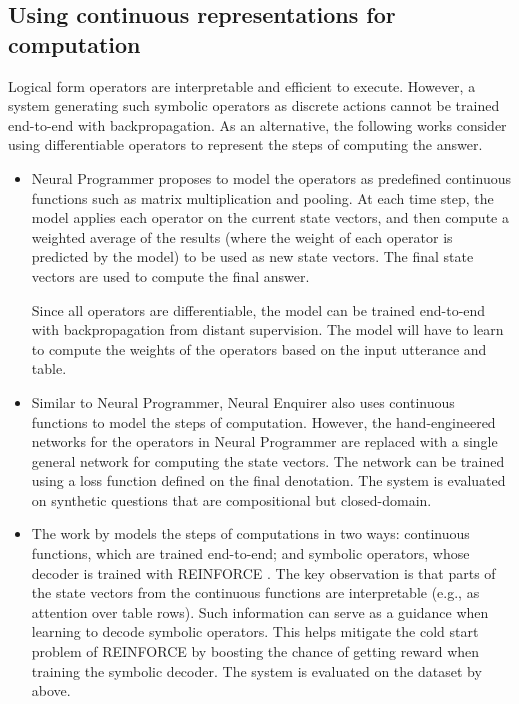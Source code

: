 \subsection{Using continuous representations for computation}

Logical form operators are interpretable
and efficient to execute.
However,
a system generating such symbolic operators as discrete actions
cannot be trained end-to-end with backpropagation.
As an alternative,
the following works consider using 
differentiable operators
to represent the steps of computing the answer.

\begin{itemize}
\item 
Neural Programmer \cite{neelakantan2016neural,neelakantan2017learning}
proposes to model the operators as predefined continuous functions
such as matrix multiplication and pooling.
At each time step, the model
applies each operator on the current state vectors,
and then compute a weighted average of the results
(where the weight of each operator is predicted by the model)
to be used as new state vectors.
The final state vectors are used to compute the final answer.

Since all operators are differentiable,
the model can be trained end-to-end with backpropagation
from distant supervision.
The model will have to learn to compute the weights of the operators
based on the input utterance and table.

\item
Similar to Neural Programmer,
Neural Enquirer \cite{yin2016neural}
also uses continuous functions to model the steps of computation.
However,
the hand-engineered networks for the operators in Neural Programmer
are replaced with a single general network
for computing the state vectors.
The network can be trained using a loss function
defined on the final denotation.
The system is evaluated on synthetic questions that are compositional
but closed-domain.

\item
The work by \citet{mou2017coupling}
models the steps of computations in two ways:
continuous functions,
which are trained end-to-end;
and symbolic operators,
whose decoder is trained with REINFORCE \cite{williams1992simple}.
The key observation is that parts of the state vectors
from the continuous functions are interpretable
(e.g., as attention over table rows).
Such information
can serve as a guidance when learning to decode symbolic operators.
This helps mitigate the cold start problem
of REINFORCE by boosting the chance of getting reward
when training the symbolic decoder.
The system is evaluated on the dataset by \citet{yin2016neural} above.

\end{itemize}

